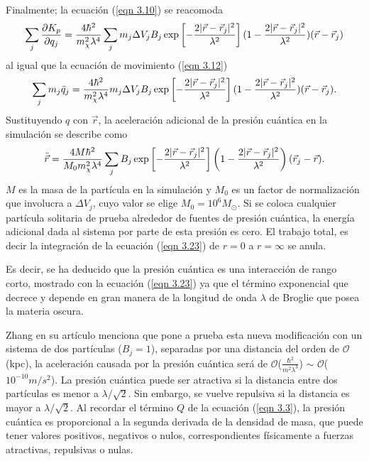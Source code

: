 \documentclass[a4paper,openright,12pt]{book}
\begin{document}
Finalmente; la ecuación (\ref{eqn 3.10}) se reacomoda
\begin{equation}
\footnotesize{\sum_{j} \frac{\partial K_{p}}{\partial q_{j}}
=
\frac{4\hbar^{2}}{m_{\chi}^{2}\lambda^{4}}
\sum_{j}m_{j}\Delta V_{j}B_{j}
\exp\left[
-\frac{2|\vec{r}-\vec{r}_{j}|^{2}}{\lambda^{2}}\right]
(1-\frac{2|\vec{r}-\vec{r}_{j}|^{2}}{\lambda^{2}})
(\vec{r}-\vec{r}_{j})}\label{eqn 3.21}
\end{equation}
al igual que la ecuación de movimiento (\ref{eqn 3.12})
\begin{equation}
\footnotesize{\sum_{j}m_{j}\ddot{q}_{j}
=
\frac{4\hbar^{2}}{m_{\chi}^{2}\lambda^{4}}
m_{j}\Delta V_{j}B_{j}
\exp\left[
-\frac{2|\vec{r}-\vec{r}_{j}|^{2}}{\lambda^{2}}\right]
(1-\frac{2|\vec{r}-\vec{r}_{j}|^{2}}{\lambda^{2}})
(\vec{r}-\vec{r}_{j}).}\label{eqn 3.22}
\end{equation}
Sustituyendo $q$ con $\vec{r}$, la aceleración adicional de la presión cuántica en la simulación se describe como
\begin{equation}
\footnotesize{\ddot{\vec{r}}
=
\frac{4M\hbar^{2}}{M_{0}m_{\chi}^{2}\lambda^{4}}
\sum_{j}B_{j}
\exp\left[
-\frac{2|\vec{r}-\vec{r}_{j}|^{2}}{\lambda^{2}}\right]
\left(1-\frac{2|\vec{r}-\vec{r}_{j}|^{2}}{\lambda^{2}}\right)
(\vec{r}_{j}-\vec{r}).}\label{eqn 3.23}
\end{equation}
$M$ es la masa de la partícula en la simulación y $M_{0}$ es un factor de normalización que involucra a $\Delta V_{j}$, cuyo valor se elige $M_{0} = 10^{6} M_{\odot}$. Si se coloca cualquier partícula solitaria de prueba alrededor de fuentes de presión cuántica, la energía adicional dada al sistema por parte de esta presión es cero. El trabajo total, es decir la integración de la ecuación (\ref{eqn 3.23}) de $r=0$ a $r=\infty$ se anula. 

Es decir, se ha deducido que la presión cuántica es una interacción de rango corto, mostrado con la ecuación (\ref{eqn 3.23}) ya que el término exponencial que decrece y depende en gran manera de la longitud de onda $\lambda$ de Broglie que posea la materia oscura.

Zhang en su artículo menciona que pone a prueba esta nueva modificación con un sistema de dos partículas ($B_{j}=1$), separadas por una distancia del orden de $\mathcal{O}$(kpc), la aceleración causada por la presión cuántica será de $\mathcal{O}$($\frac{\hbar^{2}}{m^{2}\lambda^{3}}$) $\sim$ $\mathcal{O}$($10^{-10}m/s^{2}$). La presión cuántica puede ser atractiva si la distancia entre dos partículas es menor a $\lambda/\sqrt{2}$. Sin embargo, se vuelve repulsiva si la distancia es mayor a $\lambda/\sqrt{2}$. Al recordar el término $Q$ de la ecuación (\ref{eqn 3.3}), la presión cuántica es proporcional a la segunda derivada de la densidad de masa, que puede tener valores positivos, negativos o nulos, correspondientes físicamente a fuerzas atractivas, repulsivas o nulas. 
\end{document}
